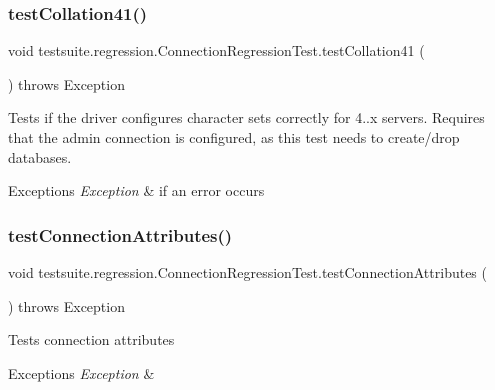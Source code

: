 \subsubsection{\texorpdfstring{test\+Collation41()}{testCollation41()}}
{\footnotesize\ttfamily void testsuite.\+regression.\+Connection\+Regression\+Test.\+test\+Collation41 (\begin{DoxyParamCaption}{ }\end{DoxyParamCaption}) throws Exception}

Tests if the driver configures character sets correctly for 4..\+x servers. Requires that the \textquotesingle{}admin connection\textquotesingle{} is configured, as this test needs to create/drop databases.


\begin{DoxyExceptions}{Exceptions}
{\em Exception} & if an error occurs \\
\hline
\end{DoxyExceptions}
\mbox{\label{classtestsuite_1_1regression_1_1_connection_regression_test_ab031515e8ccff3b5b929eccb92f9ca64}} 
\subsubsection{\texorpdfstring{test\+Connection\+Attributes()}{testConnectionAttributes()}}
{\footnotesize\ttfamily void testsuite.\+regression.\+Connection\+Regression\+Test.\+test\+Connection\+Attributes (\begin{DoxyParamCaption}{ }\end{DoxyParamCaption}) throws Exception}

Tests connection attributes


\begin{DoxyExceptions}{Exceptions}
{\em Exception} & \\
\hline
\end{DoxyExceptions}
\mbox{\label{classtestsuite_1_1regression_1_1_connection_regression_test_aaf770f994d6d32e25429a79c91cbc18b}} 
